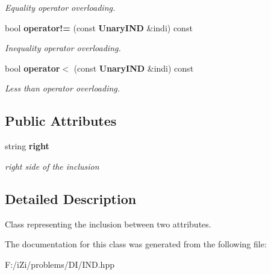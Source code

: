 \begin{CompactItemize}
\begin{CompactList}\small\item\em Equality operator overloading. \item\end{CompactList}\item 
bool {\bf operator!=} (const {\bf Unary\-IND} \&indi) const \label{class_unary_i_n_d_b1eb4d645b77166af3484258a5e64a9d}

\begin{CompactList}\small\item\em Inequality operator overloading. \item\end{CompactList}\item 
bool {\bf operator$<$} (const {\bf Unary\-IND} \&indi) const \label{class_unary_i_n_d_fb5226bfb2f58c322336979158684413}

\begin{CompactList}\small\item\em Less than operator overloading. \item\end{CompactList}\end{CompactItemize}
\subsection*{Public Attributes}
\begin{CompactItemize}
\item 
string {\bf right}\label{class_unary_i_n_d_2a3c36d6618017a28d992f80e87eba57}

\begin{CompactList}\small\item\em right side of the inclusion \item\end{CompactList}\end{CompactItemize}


\subsection{Detailed Description}
Class representing the inclusion between two attributes. 



The documentation for this class was generated from the following file:\begin{CompactItemize}
\item 
F:/i\-Zi/problems/DI/IND.hpp\end{CompactItemize}

